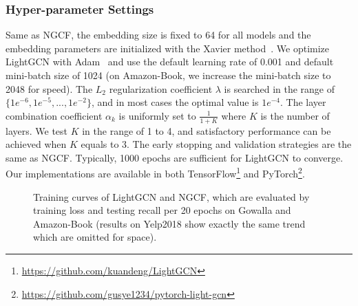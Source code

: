 \documentclass[sigconf]{acmart}
\theoremstyle{definition}
\begin{document}
\subsubsection{Hyper-parameter Settings} 
Same as NGCF, the embedding size is fixed to 64 for all models and the embedding parameters are initialized with the Xavier method~\cite{Xarvier}. We optimize LightGCN with Adam~\cite{Adam} and use the default learning rate of 0.001 and default mini-batch size of 1024 (on Amazon-Book, we increase the mini-batch size to 2048 for speed). The $L_2$ regularization coefficient $\lambda$ is searched in the range of $\{1e^{-6}, 1e^{-5}, ... , 1e^{-2}\}$, and in most cases the optimal value is $1e^{-4}$. 
The layer combination coefficient $\alpha_k$ is uniformly set to $\frac{1}{1+K}$ where $K$ is the number of layers. We test $K$ in the range of 1 to 4, and satisfactory performance can be achieved when $K$ equals to 3. 
The early stopping and validation strategies are the same as NGCF. Typically, 1000 epochs are sufficient for LightGCN to converge. Our implementations are available in both TensorFlow\footnote{\url{https://github.com/kuandeng/LightGCN}} and PyTorch\footnote{\url{https://github.com/gusye1234/pytorch-light-gcn}}. 


\begin{figure*}[t]
	\centering
	\vspace{-15pt}
	\caption{Training curves of LightGCN and NGCF, which are evaluated by training loss and testing recall per 20 epochs on Gowalla and Amazon-Book (results on Yelp2018 show exactly the same trend which are omitted for space).} \vspace{-10pt}
	\label{fig:curve}
\end{figure*}
\end{document}

